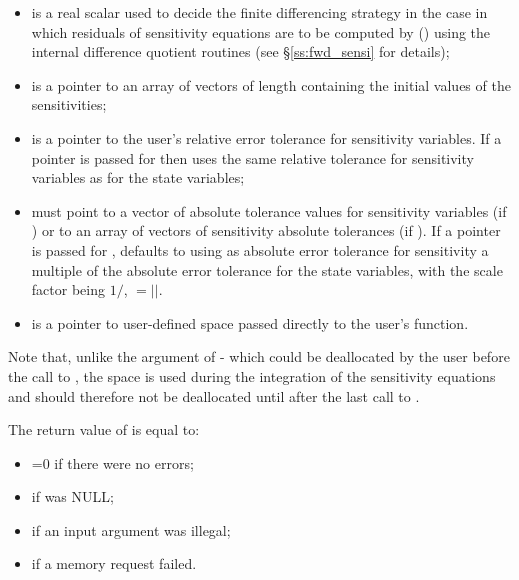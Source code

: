 \begin{itemize}
\item {} 
  is a real scalar used to decide the finite differencing strategy
  in the case in which residuals of sensitivity equations are to be 
  computed by {\cvodes} () using the internal difference
  quotient routines (see \S\ref{ss:fwd_sensi} for details);
  
\item {} 
  is a pointer to an array of  vectors of length  containing the initial 
  values of the sensitivities;
  
\item {} 
  is a pointer to the user's relative error tolerance for sensitivity variables.
  If a  pointer is passed for  then {\cvodes} uses the same
  relative tolerance for sensitivity variables as for the state variables;
  
\item {} 
  must point to a vector of  absolute tolerance values for sensitivity variables 
  (if ) or to an array of  vectors of sensitivity absolute tolerances
  (if ).
  If a  pointer is passed for , {\cvodes} defaults to using
  as absolute error tolerance for sensitivity  a multiple of the
  absolute error tolerance for the state variables, with the scale factor
  being $1/$, $=|$$|$.

\item {}
  is a pointer to user-defined space passed directly to the user's  function.
  
\end{itemize}
Note that, unlike the argument  of  - which could be deallocated
by the user before the call to , the space  is used during the
integration of the sensitivity equations and should therefore not be deallocated until
after the last call to .

The return value  of  is equal to: 
\begin{itemize}
\item {}=0 if there were no errors; 
\item {} if  was NULL;
\item {} if an input argument was illegal;
\item {} if a memory request failed. 
\end{itemize}

